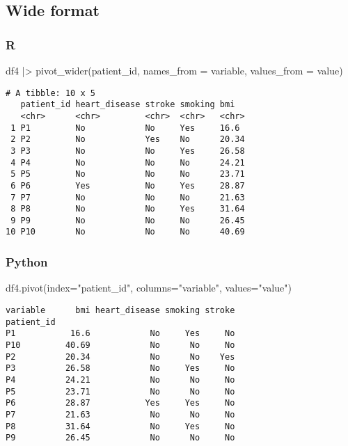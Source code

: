 \documentclass[
  letterpaper,
  DIV=11,
  numbers=noendperiod]{scrreprt}
\newenvironment{Shaded}{\begin{snugshade}}{\end{snugshade}}
\newcommand{\AttributeTok}[1]{\textcolor[rgb]{0.40,0.46,0.14}{#1}}
\newcommand{\FunctionTok}[1]{\textcolor[rgb]{0.28,0.35,0.67}{#1}}
\newcommand{\NormalTok}[1]{\textcolor[rgb]{0.00,0.46,0.62}{#1}}
\newcommand{\OperatorTok}[1]{\textcolor[rgb]{0.37,0.37,0.37}{#1}}
\newcommand{\SpecialCharTok}[1]{\textcolor[rgb]{0.37,0.37,0.37}{#1}}
\newcommand{\StringTok}[1]{\textcolor[rgb]{0.13,0.47,0.30}{#1}}
\begin{document}
\hypertarget{wide-format}{%
\subsection{Wide format}\label{wide-format}}

\hypertarget{r-32}{%
\subsubsection{R}\label{r-32}}

\begin{Shaded}
\begin{Highlighting}[]
\NormalTok{df4 }\SpecialCharTok{|\textgreater{}} \FunctionTok{pivot\_wider}\NormalTok{(patient\_id, }\AttributeTok{names\_from =}\NormalTok{ variable, }\AttributeTok{values\_from =}\NormalTok{ value)}
\end{Highlighting}
\end{Shaded}

\begin{verbatim}
# A tibble: 10 x 5
   patient_id heart_disease stroke smoking bmi  
   <chr>      <chr>         <chr>  <chr>   <chr>
 1 P1         No            No     Yes     16.6 
 2 P2         No            Yes    No      20.34
 3 P3         No            No     Yes     26.58
 4 P4         No            No     No      24.21
 5 P5         No            No     No      23.71
 6 P6         Yes           No     Yes     28.87
 7 P7         No            No     No      21.63
 8 P8         No            No     Yes     31.64
 9 P9         No            No     No      26.45
10 P10        No            No     No      40.69
\end{verbatim}

\hypertarget{python-32}{%
\subsubsection{Python}\label{python-32}}

\begin{Shaded}
\begin{Highlighting}[]
\NormalTok{df4.pivot(index}\OperatorTok{=}\StringTok{"patient\_id"}\NormalTok{, columns}\OperatorTok{=}\StringTok{"variable"}\NormalTok{, values}\OperatorTok{=}\StringTok{"value"}\NormalTok{)}
\end{Highlighting}
\end{Shaded}

\begin{verbatim}
variable      bmi heart_disease smoking stroke
patient_id                                    
P1           16.6            No     Yes     No
P10         40.69            No      No     No
P2          20.34            No      No    Yes
P3          26.58            No     Yes     No
P4          24.21            No      No     No
P5          23.71            No      No     No
P6          28.87           Yes     Yes     No
P7          21.63            No      No     No
P8          31.64            No     Yes     No
P9          26.45            No      No     No
\end{verbatim}
\end{document}
